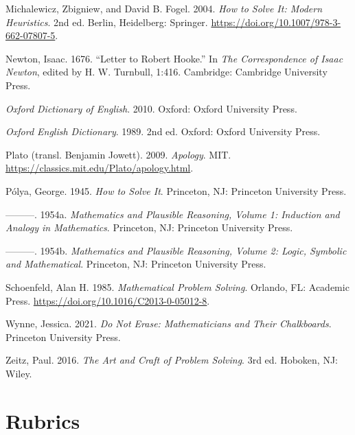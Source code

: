 \documentclass[
  a4paper,
  DIV=11,
  numbers=noendperiod,
  oneside]{scrreprt}
\newlength{\cslhangindent}
\newenvironment{CSLReferences}[2] %
 {\begin{list}{}{%
  \setlength{\itemindent}{0pt}
  \setlength{\leftmargin}{0pt}
  \setlength{\parsep}{0pt}
  \ifodd #1
   \setlength{\leftmargin}{\cslhangindent}
   \setlength{\itemindent}{-1\cslhangindent}
  \fi
  \setlength{\itemsep}{#2\baselineskip}}}
 {\end{list}}
\begin{document}
\begin{CSLReferences}{1}{0}
Michalewicz, Zbigniew, and David B. Fogel. 2004. \emph{{How to Solve It:
Modern Heuristics}}. 2nd ed. Berlin, Heidelberg: Springer.
\url{https://doi.org/10.1007/978-3-662-07807-5}.

Newton, Isaac. 1676. {``Letter to Robert Hooke.''} In \emph{The
Correspondence of Isaac Newton}, edited by H. W. Turnbull, 1:416.
Cambridge: Cambridge University Press.

\emph{Oxford Dictionary of English}. 2010. Oxford: Oxford University
Press.

\emph{Oxford English Dictionary}. 1989. 2nd ed. Oxford: Oxford
University Press.

Plato (transl. Benjamin Jowett). 2009. \emph{Apology}. MIT.
\url{https://classics.mit.edu/Plato/apology.html}.

Pólya, George. 1945. \emph{{How to Solve It}}. Princeton, NJ: Princeton
University Press.

---------. 1954a. \emph{Mathematics and Plausible Reasoning, Volume 1:
Induction and Analogy in Mathematics}. Princeton, NJ: Princeton
University Press.

---------. 1954b. \emph{Mathematics and Plausible Reasoning, Volume 2:
Logic, Symbolic and Mathematical}. Princeton, NJ: Princeton University
Press.

Schoenfeld, Alan H. 1985. \emph{Mathematical Problem Solving}. Orlando,
FL: Academic Press. \url{https://doi.org/10.1016/C2013-0-05012-8}.

Wynne, Jessica. 2021. \emph{Do Not Erase: Mathematicians and Their
Chalkboards}. Princeton University Press.

Zeitz, Paul. 2016. \emph{The Art and Craft of Problem Solving}. 3rd ed.
Hoboken, NJ: Wiley.

\end{CSLReferences}

\endgroup

\cleardoublepage
{}
{}
\appendix

\chapter{Rubrics}\label{sec-rubrics}
\end{document}

